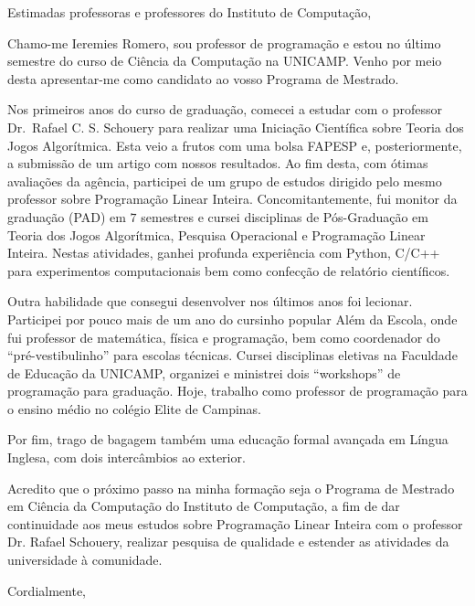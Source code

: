 \documentclass{letter}
\begin{document}
\begin{letter}{}
\opening{Estimadas professoras e professores do Instituto de Computação,}

Chamo-me Ieremies Romero, sou professor de programação e estou no último semestre do curso de Ciência da Computação na UNICAMP. Venho por meio desta apresentar-me como candidato ao vosso Programa de Mestrado.

Nos primeiros anos do curso de graduação, comecei a estudar com o professor Dr.\ Rafael C. S. Schouery para realizar uma Iniciação Científica sobre Teoria dos Jogos Algorítmica. Esta veio a frutos com uma bolsa FAPESP e, posteriormente, a submissão de um artigo com nossos resultados.
Ao fim desta, com ótimas avaliações da agência, participei de um grupo de estudos dirigido pelo mesmo professor sobre Programação Linear Inteira.
Concomitantemente, fui monitor da graduação (PAD) em \(7\) semestres e cursei disciplinas de Pós-Graduação em Teoria dos Jogos Algorítmica, Pesquisa Operacional e Programação Linear Inteira.
Nestas atividades, ganhei profunda experiência com Python, C/C++ para experimentos computacionais bem como confecção de relatório científicos.

Outra habilidade que consegui desenvolver nos últimos anos foi lecionar.
Participei por pouco mais de um ano do cursinho popular Além da Escola, onde fui professor de matemática, física e programação, bem como coordenador do ``pré-vestibulinho'' para escolas técnicas.
Cursei disciplinas eletivas na Faculdade de Educação da UNICAMP, organizei e ministrei dois ``workshops'' de programação para graduação. Hoje, trabalho como professor de programação para o ensino médio no colégio Elite de Campinas.

Por fim, trago de bagagem também uma educação formal avançada em Língua Inglesa, com dois intercâmbios ao exterior.

Acredito que o próximo passo na minha formação seja o Programa de Mestrado em Ciência da Computação do Instituto de Computação, a fim de dar continuidade aos meus estudos sobre Programação Linear Inteira com o professor Dr. Rafael Schouery, realizar pesquisa de qualidade e estender as atividades da universidade à comunidade.

\closing{Cordialmente,}
\end{letter}
\end{document}
